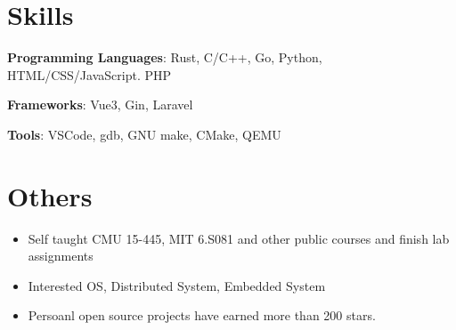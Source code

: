 \documentclass{chicv}
\begin{document}
\section{Skills}

\begin{compactlist}
  \item \textbf{Programming Languages}: Rust, C/C++, Go, Python, HTML/CSS/JavaScript. PHP
  \item \textbf{Frameworks}: Vue3, Gin, Laravel
  \item \textbf{Tools}: VSCode, gdb, GNU make, CMake, QEMU
\end{compactlist}

\section{Others}
\begin{itemize}
  \item Self taught CMU 15-445, MIT 6.S081 and other public courses and finish lab assignments 
  \item Interested OS, Distributed System, Embedded System 
  \item Persoanl open source projects have earned more than 200 stars.
\end{itemize}
\end{document}
